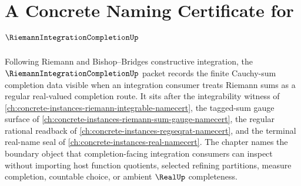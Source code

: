 \chapter{A Concrete Naming Certificate for $\RiemannIntegrationCompletionUp$}
\label{ch:concrete-instances-riemann-integration-completion-namecert}

Following Riemann and Bishop--Bridges constructive integration, the $\RiemannIntegrationCompletionUp$ packet records the finite Cauchy-sum completion data visible when an integration consumer treats Riemann sums as a regular real-valued completion route. It sits after the integrability witness of \autoref{ch:concrete-instances-riemann-integrable-namecert}, the tagged-sum gauge surface of \autoref{ch:concrete-instances-riemann-sum-gauge-namecert}, the regular rational readback of \autoref{ch:concrete-instances-regseqrat-namecert}, and the terminal real-name seal of \autoref{ch:concrete-instances-real-namecert}. The chapter names the boundary object that completion-facing integration consumers can inspect without importing host function quotients, selected refining partitions, measure completion, countable choice, or ambient $\RealUp$ completeness.

